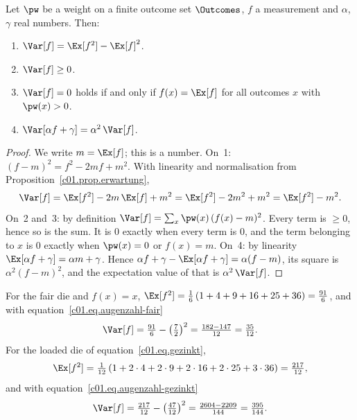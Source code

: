 \begin{proposition}\label{c01.prop.varianz}
  Let $\pw$ be a weight on a finite outcome set $\Outcomes$, $f$ a measurement
  and $\alpha$, $\gamma$ real numbers. Then:
  \begin{enumerate}
    \item $\Var[f] = \Ex[f^2] - \Ex[f]^2$.
    \item $\Var[f] \geq 0$.
    \item $\Var[f] = 0$ holds if and only if $f(x) = \Ex[f]$ for all outcomes $x$ with
      $\pw(x) > 0$.
    \item $\Var[\alpha f + \gamma] = \alpha^2\, \Var[f]$.
  \end{enumerate}
\end{proposition}
\begin{proof}
  We write $m = \Ex[f]$; this is a number. On~1:
  $(f - m)^2 = f^2 - 2 m f + m^2$. With linearity and normalisation from
  Proposition~\ref{c01.prop.erwartung},
  \begin{equation}\label{c01.eq.varianzformel}
    \Var[f] = \Ex[f^2] - 2m\, \Ex[f] + m^2 = \Ex[f^2] - 2m^2 + m^2 = \Ex[f^2] - m^2 .
  \end{equation}
  On~2 and~3: by definition $\Var[f] = \sum_x \pw(x)\,(f(x) - m)^2$. Every term
  is $\geq 0$, hence so is the sum. It is $0$ exactly when every term is $0$,
  and the term belonging to $x$ is $0$ exactly when $\pw(x) = 0$ or $f(x) = m$.
  On~4: by linearity $\Ex[\alpha f + \gamma] = \alpha m + \gamma$. Hence
  $\alpha f + \gamma - \Ex[\alpha f + \gamma] = \alpha (f - m)$, its square is
  $\alpha^2 (f - m)^2$, and the expectation value of that is $\alpha^2\, \Var[f]$.
\end{proof}

\begin{example}\label{c01.ex.wuerfel-varianz}
  For the fair die and $f(x) = x$,
  $\Ex[f^2] = \tfrac16\,(1 + 4 + 9 + 16 + 25 + 36) = \tfrac{91}{6}$, and with
  equation~\eqref{c01.eq.augenzahl-fair}
  \begin{equation}\label{c01.eq.varianz-fair}
    \Var[f] = \tfrac{91}{6} - \bigl(\tfrac72\bigr)^2 = \tfrac{182 - 147}{12} = \tfrac{35}{12} .
  \end{equation}
  For the loaded die of equation~\eqref{c01.eq.gezinkt},
  \begin{equation*}
    \Ex[f^2] = \tfrac{1}{12}\,(1 + 2\cdot 4 + 2\cdot 9 + 2\cdot 16 + 2\cdot 25 + 3\cdot 36)
    = \tfrac{217}{12} ,
  \end{equation*}
  and with equation~\eqref{c01.eq.augenzahl-gezinkt}
  \begin{equation}\label{c01.eq.varianz-gezinkt}
    \Var[f] = \tfrac{217}{12} - \bigl(\tfrac{47}{12}\bigr)^2
            = \tfrac{2604 - 2209}{144} = \tfrac{395}{144} .
  \end{equation}
\end{example}

